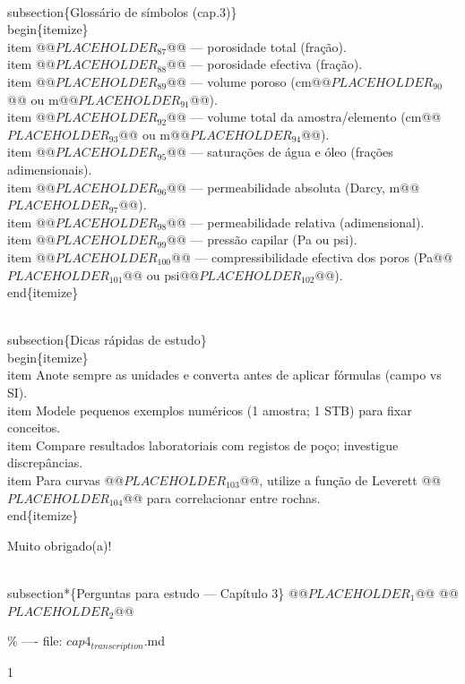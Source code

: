\documentclass[11pt,a4paper]{article}
\begin{document}
\begin{enumerate}
{\\subsection\{Glossário de símbolos (cap.3)\}
\\begin\{itemize\}
\\item @@$PLACEHOLDER_{87}$@@ — porosidade total (fração).
\\item @@$PLACEHOLDER_{88}$@@ — porosidade efectiva (fração).
\\item @@$PLACEHOLDER_{89}$@@ — volume poroso (cm@@$PLACEHOLDER_{90}$@@ ou m@@$PLACEHOLDER_{91}$@@).
\\item @@$PLACEHOLDER_{92}$@@ — volume total da amostra/elemento (cm@@$PLACEHOLDER_{93}$@@ ou m@@$PLACEHOLDER_{94}$@@).
\\item @@$PLACEHOLDER_{95}$@@ — saturações de água e óleo (frações adimensionais).
\\item @@$PLACEHOLDER_{96}$@@ — permeabilidade absoluta (Darcy, m@@$PLACEHOLDER_{97}$@@).
\\item @@$PLACEHOLDER_{98}$@@ — permeabilidade relativa (adimensional).
\\item @@$PLACEHOLDER_{99}$@@ — pressão capilar (Pa ou psi).
\\item @@$PLACEHOLDER_{100}$@@ — compressibilidade efectiva dos poros (Pa@@$PLACEHOLDER_{101}$@@ ou psi@@$PLACEHOLDER_{102}$@@).
\\end\{itemize\}

\\subsection\{Dicas rápidas de estudo\}
\\begin\{itemize\}
\\item Anote sempre as unidades e converta antes de aplicar fórmulas (campo vs SI).
\\item Modele pequenos exemplos numéricos (1 amostra; 1 STB) para fixar conceitos.
\\item Compare resultados laboratoriais com registos de poço; investigue discrepâncias.
\\item Para curvas @@$PLACEHOLDER_{103}$@@, utilize a função de Leverett @@$PLACEHOLDER_{104}$@@ para correlacionar entre rochas.
\\end\{itemize\}


Muito obrigado(a)!

\\subsection*\{Perguntas para estudo --- Capítulo 3\}
@@$PLACEHOLDER_{1}$@@
@@$PLACEHOLDER_{2}$@@

\% ---- file: $cap4_{transcription}$.md



1



}
\end{enumerate}
\end{document}
